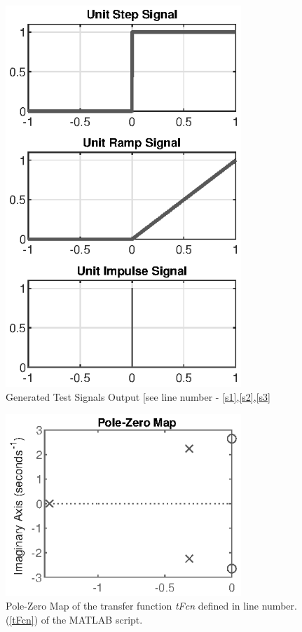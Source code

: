 \documentclass[12pt,conference,a4paper,twocolumn]{IEEEtran}
\begin{document}
\begin{figure}[t]
\centering
\includegraphics[width=3.5in]{ec692_1_plt.eps}
\caption{Generated Test Signals Output [see line number - \ref{s1},\ref{s2},\ref{s3}}
\label{signal}
\end{figure}

\begin{figure}[t]
\centering
\includegraphics[width=3.5in]{ec692_2_plt.eps}
\caption{Pole-Zero Map of the transfer function \textit{tFcn} defined in line number.(\ref{tFcn}) of the MATLAB script.}
\label{pzplt}
\end{figure}
\end{document}
